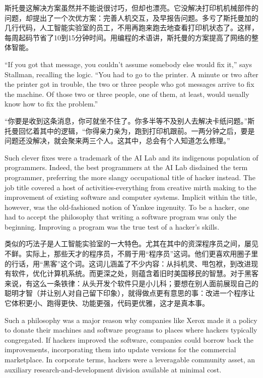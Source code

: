\ifdefined\chs
斯托曼这解决方案虽然并不能说很讨巧，但却也漂亮。它没解决打印机机械部件的问题，却提出了一个次优方案：完善人机交互，及早报告问题。多亏了斯托曼加的几行代码，人工智能实验室的员工，不用再跑来跑去地查看打印机状态了。这样，每周起码节省了10到15分钟时间。用编程的术语讲，斯托曼的方案提高了网络的整体智能。
\fi

\ifdefined\eng
``If you got that message, you couldn't assume somebody else would fix it,'' says Stallman, recalling the logic. ``You had to go to the printer. A minute or two after the printer got in trouble, the two or three people who got messages arrive to fix the machine. Of those two or three people, one of them, at least, would usually know how to fix the problem.''
\fi

\ifdefined\chs
``你要是收到这条消息，你可就坐不住了。你多半等不及别人去解决卡纸问题。''斯托曼回忆着其中的逻辑，``你得亲力亲为，跑到打印机跟前。一两分钟之后，要是问题还没解决，就会聚来两三个人。这其中，总会有个人知道怎么修理。''
\fi

\ifdefined\eng
Such clever fixes were a trademark of the AI Lab and its indigenous population of programmers. Indeed, the best programmers at the AI Lab disdained the term programmer, preferring the more slangy occupational title of hacker instead. The job title covered a host of activities-everything from creative mirth making to the improvement of existing software and computer systems. Implicit within the title, however, was the old-fashioned notion of Yankee ingenuity. To be a hacker, one had to accept the philosophy that writing a software program was only the beginning. Improving a program was the true test of a hacker's skills.
\fi

\ifdefined\chs
类似的巧法子是人工智能实验室的一大特色。尤其在其中的资深程序员之间，屡见不鲜。实际上，那些天才的程序员，不屑于用``程序员''这词。他们更喜欢用圈子里的行话，用``黑客''这个词。这词儿涵盖了不少内容：从抖机灵、甩包袱，到改进现有软件，优化计算机系统。而更深之处，则蕴含着旧时美国移民的智慧。对于黑客来说，有这么一条铁律：从头开发个软件只是小儿科；要想在别人面前展现自己的聪明才智（并让别人对自己留下印象），就得做点更有意思的事：改进一个程序让它体积更小、跑得更快、功能更强，代码更优雅，这才是真本事。
\fi

\ifdefined\eng
Such a philosophy was a major reason why companies like Xerox made it a policy to donate their machines and software programs to places where hackers typically congregated. If hackers improved the software, companies could borrow back the improvements, incorporating them into update versions for the commercial marketplace. In corporate terms, hackers were a leveragable community asset, an auxiliary research-and-development division available at minimal cost.
\fi

